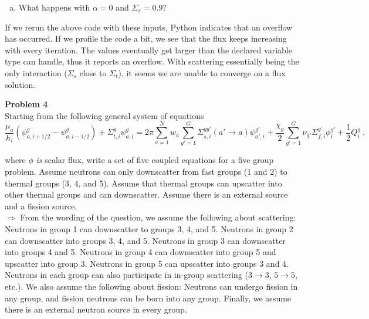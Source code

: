 \documentclass[10pt]{article}
\begin{document}
%
%
%

\vspace{10pt}
\begin{enumerate}[(d)]
\item What happens with $\alpha = 0$ and $\Sigma_s = 0.9$?
\end{enumerate}

If we rerun the above code with these inputs, Python indicates that an overflow has occurred. If we profile the code a bit, we see that the flux keeps increasing with every iteration. The values eventually get larger than the declared variable type can handle, thus it reports an overflow. With scattering essentially being the only interaction ($\Sigma_s$ close to $\Sigma_t$), it seems we are unable to converge on a flux solution.





\newpage
\noindent \textbf{Problem 4}\\
Starting from the following general system of equations
%
\begin{equation*}
\frac{\mu_a}{h_i}(\psi_{a,i+1/2}^g - \psi_{a,i-1/2}^g)+ \Sigma_{t,i}^g\psi_{a,i}^g = 2\pi\sum_{a=1}^N w_a \sum_{g'=1}^G \Sigma_{s, i}^{gg'}(a'\rightarrow a)\psi_{a',i}^{g'} + \frac{\chi_g}{2}\sum_{g'=1}^G \nu_{g'}\Sigma_{f,i}^{g'} \phi_{i}^{g'} + \frac{1}{2}Q_i^g\:,
\end{equation*}

where  $\phi$ \textit{is} scalar flux, write a set of five coupled equations for a five group problem. Assume neutrons can only downscatter from fast groups (1 and 2) to thermal groups (3, 4, and 5). Assume that thermal groups can upscatter into other thermal groups and can downscatter. Assume there is an external source and a fission source.\\

$\Rightarrow$ From the wording of the question, we assume the following about scattering: Neutrons in group 1 can downscatter to groups 3, 4, and 5. Neutrons in group 2 can downscatter into groups 3, 4, and 5. Neutrons in group 3 can downscatter into groups 4 and 5. Neutrons in group 4 can downscatter into group 5 and upscatter into group 3. Neutrons in group 5 can upscatter into groups 3 and 4. Neutrons in each group can also participate in in-group scattering ($3\rightarrow3$, $5\rightarrow5$, etc.). We also assume the following about fission: Neutrons can undergo fission in any group, and fission neutrons can be born into any group. Finally, we assume there is an external neutron source in every group. \\
\end{document}
